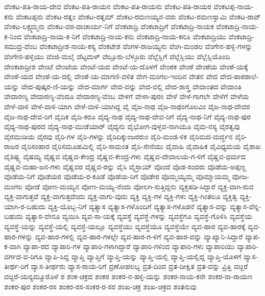 {ವೆಂಕಟ-ಪತಿ-ರಾಯ-ದೇವ
ವೆಂಕಟ-ಪತಿ-ರಾಯನ
ವೆಂಕಟ-ಪತಿ-ರಾಯನು
ವೆಂಕಟ-ಪತಿ-ರಾಯರ
ವೆಂಕಟಪ್ಪ-ನಾಯ-ಕನು
ವೆಂಕಟಪ್ಪನು
ವೆಂಕಟ-ರತ್ನಂ
ವೆಂಕಟ-ರತ್ನಮ್
ವೆಂಕಟ-ರಮಣಯ್ಯನ-ವರು
ವೆಂಕಟ-ರಮಣಸ್ವಾಮಿ
ವೆಂಕಟ-ರಾವ್
ವೆಂಕಟ-ಲಕ್ಷ್ಮಮ್ಮನು
ವೆಂಕಟ-ವರ-ದಾಚಾರ್ಯ-ನಿಗೆ
ವೆಂಕಟಾದ್ರಿ
ವೆಂಕಟಾದ್ರಿಗೆ
ವೆಂಕಟಾದ್ರಿ-ನಾಯಕ
ವೆಂಕಟಾದ್ರಿ-ನಾಯ-ಕ-ನಿಂದ
ವೆಂಕಟಾದ್ರಿ-ನಾಯ-ಕ-ನಿಗೆ
ವೆಂಕಟಾದ್ರಿ-ನಾಯ-ಕನು
ವೆಂಕಟಾದ್ರಿ-ನಾಯ-ಕನೂ
ವೆಂಕಟಾದ್ರಿಯು
ವೆಂಕಟಾದ್ರಿ-ಸಮುದ್ರ-ವೆಂಬ
ವೆಂಕಟಾದ್ರೀಶ-ನಾಯ-ಕಸ್ಯ
ವೆಂಕಟೇಶ
ವೆಂಗಳ-ರಾಜಯ್ಯನು
ವೆಂಗಿ-ಮಂಡಲ
ವೆಂಗೇನ-ಹಳ್ಳಿ-ಗಳನ್ನು
ವೆಂಗೇನ-ಹಳ್ಳಿಯು
ವೆಂಜಿ-ಮಲೈ
ವೆಟ್ಟದುಳ್
ವೆಲ್ಲೂರು-ಬೆಳ್ಳೂರು
ವೆಲ್ಲೆಸ್ಲಿಗೆ
ವೆಲ್ಲೆಸ್ಲಿಯು
ವೆಲ್ಲೆಸ್ಲಿಯೊಂದಿ
ವೇಂಕಟಾದ್ರೀಶ
ವೇಂಟೆ
ವೇಂಟೆಯ
ವೇಂಟೆ-ಯದ
ವೇಂಟೆ-ಯ-ದೊಳಗೆ
ವೇಂಠಕ
ವೇಂಠೆ
ವೇಂಠೆಯ
ವೇಂಠೆ-ಯಕ್ಕೆ
ವೇಂಠೆ-ಯದ
ವೇಂಠೆ-ಯ-ದಲ್ಲಿ
ವೇಂಠೆ-ಯ-ಮಾಗಣಿ-ವಳಿತ
ವೇಗ-ಮಂಗಲ-ಇಂದಿನ
ವೇತನ
ವೇದ
ವೇದ-ಪಾಠಶಾಲೆ-ಯನ್ನು
ವೇದ-ಪುಷ್ಕರ-ಣಿ-ಯನ್ನು
ವೇದ-ಮಾರ್ಗ
ವೇದ-ವನ್ನು
ವೇದ-ವಲ್ಲಿ
ವೇದ-ಶಾಸ್ತ್ರ
ವೇದಾಂತದ
ವೇದಾಂತಿ
ವೇದಾರಣ್ಯ
ವೇದಾರಣ್ಯ-ವೆಂದೂ
ವೇದಾರಣ್ಯ-ವೆಂಬ
ವೇಳಗೆ
ವೇಳಾ-ಪುರಂ
ವೇಳೆ
ವೇಳೆ-ಗಾಗಲೇ
ವೇಳೆಗೆ
ವೇಳೆಯ
ವೇಳೆ-ವಾಳಿ
ವೇಳೆ-ವಾಳಿ-ಯಾಗಿ
ವೇಳೆ-ವಾಳಿ-ಯಾಗಿದ್ದ
ವೈ
ವೈಜ-ನಾಥ
ವೈಜ-ನಾಥಂಗೊಲವಿಂ
ವೈಜ-ನಾಥ-ದೇವರ
ವೈಜ-ನಾಥ-ದೇವ-ರಿಗೆ
ವೈದಿಕ
ವೈದಿ-ಕರೂ
ವೈದ್ಯ-ನಾಥ
ವೈದ್ಯ-ನಾಥ-ದೇವ-ರಿಗೆ
ವೈದ್ಯ-ನಾಥ-ನಿಗೆ
ವೈದ್ಯ-ನಾಥ-ಪುರ
ವೈದ್ಯ-ನಾಥ-ಪುರದ
ವೈದ್ಯ-ನಾಥ-ಮುಡೆಯಾರ್
ವೈದ್ಯನು
ವೈಭೋಗ-ವುಳ್ಳವ-ನಾಗಿಯೂ
ವೈಮ-ನಸ್ಯ
ವೈರತ್ವವು
ವೈರಮುಡಿಯ
ವೈರವು
ವೈರಿ-ಗಳ
ವೈರಿ-ಗಳನ್ನು
ವೈರಿದಿಕ್ಕುಂಜರರುಂ
ವೈರಿ-ಮಂಡ-ಳಿಕ
ವೈರಿಮದ-ಮರ್ದ್ಧನ
ವೈರಿ-ರಾಜರ
ವೈರಿಸಂಹಾರ
ವೈರಿಸಮೂಹಮಿಲ್ಲಿ
ವೈರಿ-ಸಾಮಂತ
ವೈರಿ-ಸೇನೆಯು
ವೈವಾಹಿ
ವೈವಾಹಿಕ
ವೈವಿಧ್ಯಮಯ
ವೈಶಾಖ
ವೈಶಿಷ್ಟ್ಯ
ವೈಷಮ್ಯ
ವೈಷ್ಣವ
ವೈಷ್ಣವ-ಕೇಂದ್ರ
ವೈಷ್ಣವ-ಕೇಂದ್ರ-ಗಳು
ವೈಷ್ಣವ-ದೇವಾಲಯ-ಗ-ಳಿಗೆ
ವೈಷ್ಣವ-ಧರ್ಮದ
ವೈಷ್ಣವ-ಮಹಾ-ಜನ-ಗಳು
ವೈಷ್ಣವರ
ವೈಷ್ಣವ-ರನ್ನು
ವೈಸಿ
ವೈಸ್ರಾಯ್
ವೊಂದೆ
ವೊಡ-ಸಂದರು
ವೊಡೆಯ-ಅಪ್ಪಣ್ಣ
ವೊಡೆಯ-ನಿಗೆ
ವೊಡೆಯರ
ವೊಡೆಯ-ರ-ಕೂಡೆ
ವೊಡೆಯ-ರಿಗೆ
ವೊಡೇರ
ವೊಮ್ಮಯ್ಯಮ್ಮ
ವೊಮ್ಮಾಯಮ್ಮ
ವೋಜ-ಮಂಗಲ
ವೋಡೆ
ವೋಣ-ಮಯ್ಯನ
ವೋಣ-ಮಯ್ಯ-ನೆಂದು
ವೋಲಗಿ-ಸುತ್ತಿದ್ದನು
ವ್ಯಕ್ತಪಡಿ-ಸಿದ್ದಾರೆ
ವ್ಯಕ್ತ-ವಾಗಿ-ರುವ
ವ್ಯಕ್ತ-ವಾಗುತ್ತದೆ
ವ್ಯಕ್ತ-ವಾಗುತ್ತದೆಂದು
ವ್ಯಕ್ತ-ವಾಗು-ವುದು
ವ್ಯಕ್ತಿ
ವ್ಯಕ್ತಿ-ಗಳ
ವ್ಯಕ್ತಿ-ಗಳು
ವ್ಯಕ್ತಿ-ಗಿಂತಲೂ
ವ್ಯಕ್ತಿತ್ವ
ವ್ಯಕ್ತಿ-ಯಾಗಿ-ರ-ಬಹುದು
ವ್ಯಕ್ತಿ-ಯೊಬ್ಬ-ನಿಗೆ
ವ್ಯತ್ಯಾಸ
ವ್ಯತ್ಯಾಸ-ಗಳೊಂದಿಗೆ
ವ್ಯತ್ಯಾಸ-ಗಳೊಡನೆ
ವ್ಯತ್ಯಾಸ-ವನ್ನು
ವ್ಯತ್ಯಾಸ-ವೆನ್ನ-ಬಹುದು
ವ್ಯತ್ಯಾಸ-ವೇನೂ
ವ್ಯಯಿಸಿ
ವ್ಯವ-ಸಾ-ಯಕ್ಕೆ
ವ್ಯವಸ್ಥೆ
ವ್ಯವಸ್ಥೆ-ಗಳನ್ನು
ವ್ಯವಸ್ಥೆಗೂ
ವ್ಯವಸ್ಥೆ-ಗೊಳಿಸಿ
ವ್ಯವಸ್ಥೆಯ
ವ್ಯವಸ್ಥೆ-ಯನ್ನು
ವ್ಯವಸ್ಥೆ-ಯಲ್ಲಿ
ವ್ಯವಸ್ಥೆ-ಯಲ್ಲೂ
ವ್ಯವಸ್ಥೆಯು
ವ್ಯವಸ್ಥೆಯೂ
ವ್ಯವಸ್ಥೆಯೇ
ವ್ಯವ-ಹಾರ
ವ್ಯವ-ಹಾರಕ್ಕೆ
ವ್ಯವ-ಹಾರ-ಗಳನ್ನು
ವ್ಯವ-ಹಾರ-ಗಳಲ್ಲಿ
ವ್ಯವ-ಹಾರ-ಗಳಲ್ಲೇ
ವ್ಯವ-ಹಾರ-ಗ-ಳಿಗೆ
ವ್ಯವ-ಹಾರ-ವನ್ನು
ವ್ಯಾಖ್ಯಾನಿ-ಸಿದ್ದಾರೆ
ವ್ಯಾಪ-ಕ-ವಾಗಿ
ವ್ಯಾಪಾ-ರದ
ವ್ಯಾಪಾರಿ-ಗಳ
ವ್ಯಾಪಾರಿ-ಗಳಾಗಿದ್ದಾರೆ
ವ್ಯಾಪಾರಿ-ಗಳಿಂದ
ವ್ಯಾಪಾರಿ-ಗಳು
ವ್ಯಾಪಾರಿಯು
ವ್ಯಾಪಾರಿ-ವರ್ಗದ-ವ-ರಿಗೂ
ವ್ಯಾಪಿ-ಸಿದ್ದ
ವ್ಯಾಪ್ತಿ
ವ್ಯಾಪ್ತಿಗೆ
ವ್ಯಾಪ್ತಿ-ಯನ್ನು
ವ್ಯಾಪ್ತಿ-ಯಲ್ಲಿ
ವ್ಯಾಪ್ತಿ-ಯಲ್ಲಿದ್ದ
ವ್ಯಾಪ್ತಿ-ಯೊಳಗೆ
ವ್ಯಾಸ-ತೀರ್ಥ-ರಿಗೆ
ವ್ಯಾಸ-ತೀರ್ಥರು
ವ್ಯಾಸ-ರಾಯ-ರಿಗೆ
ವ್ರಣೋಪಲಬ್ದ
ವ್ರತ-ದಿಂದ
ವ್ರತ-ದೀಕ್ಷಿತ
ವ್ರತ-ವನ್ನು
ವ್ರಿತ್ತಿ
ವೞ್ದರೆ
ವೞ್ದರೆ-ಯನ್ಯಮ್ಮೂರೊಳೆ
ಶ
ಶಂಕ-ಚಕ್ರದ
ಶಂಕರ
ಶಂಕರ-ನ-ಹಳ್ಳಿ-ಯನ್ನು
ಶಂಕರ-ನಾಯ-ಕನೇ
ಶಂಕರ-ನಾ-ರಾಯಣ
ಶಂಕರ-ಪುರ
ಶಂಕರ-ರಸ
ಶಂಕರ-ರಸ-ಸಂಕರ-ರ-ಸರ
ಶಂಖ-ಚಕ್ರ
ಶಂಖ-ಚಕ್ರದ
ಶಂತನುವು
}
